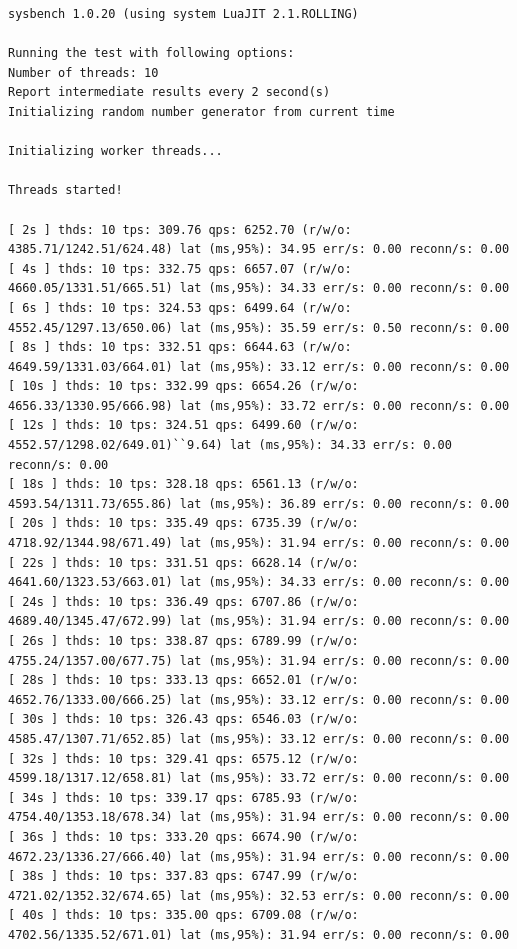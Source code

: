 \documentclass{article}
\begin{document}
\begin{verbatim}
sysbench 1.0.20 (using system LuaJIT 2.1.ROLLING)

Running the test with following options:
Number of threads: 10
Report intermediate results every 2 second(s)
Initializing random number generator from current time

Initializing worker threads...

Threads started!

[ 2s ] thds: 10 tps: 309.76 qps: 6252.70 (r/w/o: 4385.71/1242.51/624.48) lat (ms,95%): 34.95 err/s: 0.00 reconn/s: 0.00
[ 4s ] thds: 10 tps: 332.75 qps: 6657.07 (r/w/o: 4660.05/1331.51/665.51) lat (ms,95%): 34.33 err/s: 0.00 reconn/s: 0.00
[ 6s ] thds: 10 tps: 324.53 qps: 6499.64 (r/w/o: 4552.45/1297.13/650.06) lat (ms,95%): 35.59 err/s: 0.50 reconn/s: 0.00
[ 8s ] thds: 10 tps: 332.51 qps: 6644.63 (r/w/o: 4649.59/1331.03/664.01) lat (ms,95%): 33.12 err/s: 0.00 reconn/s: 0.00
[ 10s ] thds: 10 tps: 332.99 qps: 6654.26 (r/w/o: 4656.33/1330.95/666.98) lat (ms,95%): 33.72 err/s: 0.00 reconn/s: 0.00
[ 12s ] thds: 10 tps: 324.51 qps: 6499.60 (r/w/o: 4552.57/1298.02/649.01)``9.64) lat (ms,95%): 34.33 err/s: 0.00 reconn/s: 0.00
[ 18s ] thds: 10 tps: 328.18 qps: 6561.13 (r/w/o: 4593.54/1311.73/655.86) lat (ms,95%): 36.89 err/s: 0.00 reconn/s: 0.00
[ 20s ] thds: 10 tps: 335.49 qps: 6735.39 (r/w/o: 4718.92/1344.98/671.49) lat (ms,95%): 31.94 err/s: 0.00 reconn/s: 0.00
[ 22s ] thds: 10 tps: 331.51 qps: 6628.14 (r/w/o: 4641.60/1323.53/663.01) lat (ms,95%): 34.33 err/s: 0.00 reconn/s: 0.00
[ 24s ] thds: 10 tps: 336.49 qps: 6707.86 (r/w/o: 4689.40/1345.47/672.99) lat (ms,95%): 31.94 err/s: 0.00 reconn/s: 0.00
[ 26s ] thds: 10 tps: 338.87 qps: 6789.99 (r/w/o: 4755.24/1357.00/677.75) lat (ms,95%): 31.94 err/s: 0.00 reconn/s: 0.00
[ 28s ] thds: 10 tps: 333.13 qps: 6652.01 (r/w/o: 4652.76/1333.00/666.25) lat (ms,95%): 33.12 err/s: 0.00 reconn/s: 0.00
[ 30s ] thds: 10 tps: 326.43 qps: 6546.03 (r/w/o: 4585.47/1307.71/652.85) lat (ms,95%): 33.12 err/s: 0.00 reconn/s: 0.00
[ 32s ] thds: 10 tps: 329.41 qps: 6575.12 (r/w/o: 4599.18/1317.12/658.81) lat (ms,95%): 33.72 err/s: 0.00 reconn/s: 0.00
[ 34s ] thds: 10 tps: 339.17 qps: 6785.93 (r/w/o: 4754.40/1353.18/678.34) lat (ms,95%): 31.94 err/s: 0.00 reconn/s: 0.00
[ 36s ] thds: 10 tps: 333.20 qps: 6674.90 (r/w/o: 4672.23/1336.27/666.40) lat (ms,95%): 31.94 err/s: 0.00 reconn/s: 0.00
[ 38s ] thds: 10 tps: 337.83 qps: 6747.99 (r/w/o: 4721.02/1352.32/674.65) lat (ms,95%): 32.53 err/s: 0.00 reconn/s: 0.00
[ 40s ] thds: 10 tps: 335.00 qps: 6709.08 (r/w/o: 4702.56/1335.52/671.01) lat (ms,95%): 31.94 err/s: 0.00 reconn/s: 0.00

\end{verbatim}
\end{document}
